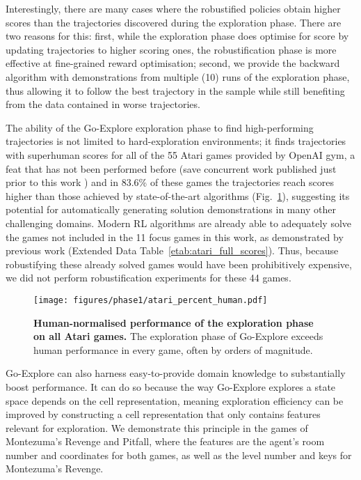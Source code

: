 \documentclass{nature}
\renewcommand*{\cite}[1]{\supercite{#1}}
\begin{document}
Interestingly, there are many cases where the robustified policies obtain higher scores than the trajectories discovered during the exploration phase.
There are two reasons for this:
first, while the exploration phase does optimise for score by updating trajectories to higher scoring ones, the robustification phase
is more effective at fine-grained reward optimisation;
second, we provide the backward algorithm with demonstrations from multiple (10) runs of the exploration phase, thus allowing it to follow the best trajectory in the sample while still benefiting from the data contained in worse trajectories.


The ability of the Go-Explore exploration phase to find high-performing trajectories is not limited to hard-exploration environments; it finds trajectories with superhuman scores for all of the 55 Atari games provided by OpenAI gym\cite{brockman}, a feat that has not been performed before (save concurrent work published just prior to this work \cite{badia2020agent57})
and in 83.6\% of these games the trajectories reach scores higher than those achieved by state-of-the-art algorithms (Fig.~\ref{fig:phase1_sota}), suggesting its potential for automatically generating solution demonstrations in many other challenging domains.
Modern RL algorithms are already able to adequately solve the games not included in the 11 focus games in this work, as demonstrated by previous work (Extended Data Table~\ref{etab:atari_full_scores}).
Thus, because robustifying these already solved games would have been prohibitively expensive, we did not perform robustification experiments for these 44 games.

\begin{figure}
    \centering
    \texttt{[image: figures/phase1/atari\_percent\_human.pdf]}
    \caption{\textbf{Human-normalised performance of the exploration phase on all Atari games.} The exploration phase of Go-Explore exceeds human performance in every game, often by orders of magnitude. 
    }
    \label{fig:phase1_sota}
\end{figure}

Go-Explore can also harness easy-to-provide domain knowledge to substantially boost performance.
It can do so because the way Go-Explore explores a state space depends on the cell representation, meaning exploration efficiency can be improved by constructing a cell representation that only contains features relevant for exploration.
We demonstrate this principle in the games of Montezuma's Revenge and Pitfall, where the features are the agent's room number and coordinates for both games, as well as the level number and keys for Montezuma's Revenge.
\end{document}
